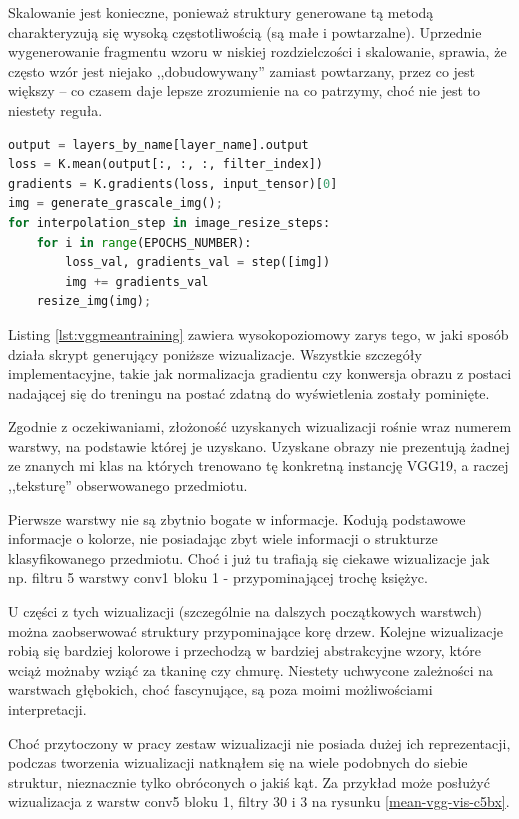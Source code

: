 Skalowanie jest konieczne, ponieważ struktury generowane tą metodą charakteryzują się wysoką częstotliwością (są małe i powtarzalne). Uprzednie wygenerowanie fragmentu wzoru w niskiej rozdzielczości i skalowanie, sprawia, że często wzór jest niejako ,,dobudowywany'' zamiast powtarzany, przez co jest większy -- co czasem daje lepsze zrozumienie na co patrzymy, choć nie jest to niestety reguła.

\label{lst:vggmeantraining}
\begin{lstlisting}[language=Python, caption={Wizualizowanie poprzez maksymalizację mediany wybranej warstwy.}, captionpos=b]
output = layers_by_name[layer_name].output
loss = K.mean(output[:, :, :, filter_index])
gradients = K.gradients(loss, input_tensor)[0]
img = generate_grascale_img();
for interpolation_step in image_resize_steps:
    for i in range(EPOCHS_NUMBER):
        loss_val, gradients_val = step([img])
        img += gradients_val 
    resize_img(img);
\end{lstlisting}

Listing \ref{lst:vggmeantraining} zawiera wysokopoziomowy zarys tego, w jaki sposób działa skrypt generujący poniższe wizualizacje. Wszystkie szczegóły implementacyjne, takie jak normalizacja gradientu czy konwersja obrazu z postaci nadającej się do treningu na postać zdatną do wyświetlenia zostały pominięte.

Zgodnie z oczekiwaniami, złożoność uzyskanych wizualizacji rośnie wraz numerem warstwy, na podstawie której je uzyskano. Uzyskane obrazy nie prezentują żadnej ze znanych mi klas na których trenowano tę konkretną instancję VGG19, a raczej ,,teksturę'' obserwowanego przedmiotu.

Pierwsze warstwy nie są zbytnio bogate w informacje. Kodują podstawowe informacje o kolorze, nie posiadając zbyt wiele informacji o strukturze klasyfikowanego przedmiotu. Choć i już tu trafiają się ciekawe wizualizacje jak np. filtru 5 warstwy conv1 bloku 1 - przypominającej trochę księżyc. 

U części z tych wizualizacji (szczególnie na dalszych początkowych warstwch) można zaobserwować struktury przypominające korę drzew. Kolejne wizualizacje robią się bardziej kolorowe i przechodzą w bardziej abstrakcyjne wzory, które wciąż możnaby wziąć za tkaninę czy chmurę. Niestety uchwycone zależności na warstwach głębokich, choć fascynujące, są poza moimi możliwościami interpretacji.

Choć przytoczony w pracy zestaw wizualizacji nie posiada dużej ich reprezentacji, podczas tworzenia wizualizacji natknąłem się na wiele podobnych do siebie struktur, nieznacznie tylko obróconych o jakiś kąt. Za przykład może posłużyć wizualizacja z warstw conv5 bloku 1, filtry 30 i 3 na rysunku \ref{mean-vgg-vis-c5bx}.

